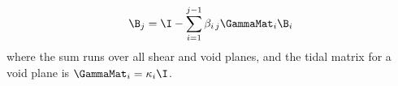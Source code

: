 \begin{equation}
\label{eq:Bold}
  \B_j = \I - \sum_{i=1}^{j-1} \beta_{i\,j} \GammaMat_i \B_i
\end{equation}
where the sum runs over all shear and void planes, and the tidal matrix for a void plane is $\GammaMat_i = \kappa_i \I$. 
  
  